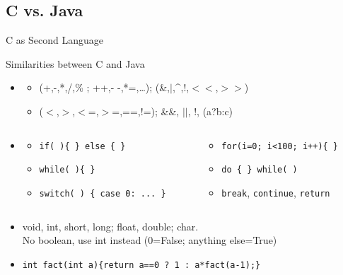 \subsection{C vs. Java}
\begin{frame}{C as Second Language}
  \begin{block}{Similarities between C and Java}
    \begin{itemize}
    \item {}
      \begin{itemize}
      \item {} (+,-,*,/,\% ;  ++,- -,*=,\ldots);
         (\&,$|$,\^{},!,$<<$,$>>$)
      \item {} ($<$,$>$,$<$=,$>$=,==,!=);
       \&\&, $||$, !, (a?b:c)
      \end{itemize}
    \item {}\vspace{-.5\baselineskip}
      \begin{columns}
        \begin{column}{.5\linewidth}
          \begin{itemize}
          \item \texttt{if( )\{ \} else \{ \}}
          \item \texttt{while( )\{ \}}
          \item \texttt{switch( ) \{ case 0: ... \}}
          \end{itemize}
        \end{column}
        \begin{column}{.45\linewidth}
          \begin{itemize}
          \item \texttt{for(i=0; i<100; i++)\{ \}}
          \item \texttt{do \{ \} while( )}
          \item \texttt{break}, \texttt{continue}, \texttt{return}
          \end{itemize}
        \end{column}
      \end{columns}\smallskip
    \item {} void, int, short, long; float,
      double; char.\\ {\small No boolean, use int instead  (0=False; anything
        else=True)}

    \item {} \texttt{\small int fact(int a)\{return a==0 ? 1 : a*fact(a-1);\}}
    \end{itemize}
  \end{block}\vspace{-\baselineskip}


\end{frame}
